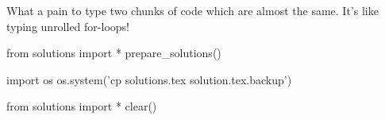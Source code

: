 What a pain to type two chunks of code which are almost the same. It's
like typing unrolled for-loops!





\begin{python0}
from solutions import *
prepare_solutions()
\end{python0}
\begin{python}
import os
os.system('cp solutions.tex solution.tex.backup')  
\end{python}

\begin{python0}
from solutions import *
clear()
\end{python0}
